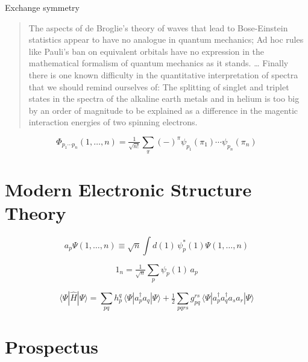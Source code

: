 \noindent
Exchange symmetry\cite{Heisenberg:1926p411}
\begin{quote}
    The aspects of de Broglie's theory of waves that lead to Bose-Einstein
    statistics\cite{Bose:1924p178,Einstein:1924p261,Einstein:1925p3} appear to
    have no analogue in quantum mechanics;
    Ad hoc rules like Pauli's ban on equivalent orbitals have no expression in
    the mathematical formalism of quantum mechanics as it stands.
    \dots
    Finally there is one known difficulty in the quantitative interpretation of
    spectra that we should remind ourselves of:
    The splitting of singlet and triplet states in the spectra of the alkaline
    earth metals and in helium is too big by an order of magnitude to be
    explained as a difference in the magentic interaction energies of two
    spinning electrons.
\end{quote}


\begin{equation}
    \Phi_{p_1\cdots p_n}(1, \ldots, n)
    =
    \tfrac{1}{\sqrt{n!}}
    \sum_{\pi}
    (-)^\pi
    \psi_{p_1}(\pi_1)
    \cdots
    \psi_{p_n}(\pi_n)
\end{equation}



\section{Modern Electronic Structure Theory}

\begin{equation}
    a_p
    \Psi(1, \ldots, n)
    \equiv
    \sqrt{n}
    \int
    d(1)\,
    \psi_p^*(1)
    \Psi(1, \ldots, n)
\end{equation}

\begin{equation}
    1_n
    =
    \tfrac{1}{\sqrt{n}}
    \sum_p
    \psi_p(1)\,
    a_p
\end{equation}

\begin{equation}
    \langle\Psi|\hat{H}|\Psi\rangle
    =
    \sum_{pq}
    h_p^q\,
    \langle\Psi|a_p^\dagger a_q|\Psi\rangle
    +
    \tfrac{1}{2}
    \sum_{pqrs}
    g_{pq}^{rs}\,
    \langle\Psi|a_p^\dagger a_q^\dagger a_s a_r|\Psi\rangle
\end{equation}


\section{Prospectus}



